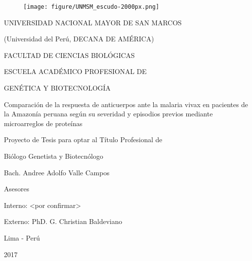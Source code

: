 \documentclass[]{article}
\title{}
\author{}
\date{}
\begin{document}
\renewcommand{\contentsname}{Índice General} 
\renewcommand{\tablename}{Tabla}
\renewcommand{\tableautorefname}{Tabla}


\clearpage
{} \vspace*{\fill}

\begin{centering}

\begin{figure}[!ht]
  \begin{center}
    \texttt{[image: figure/UNMSM\_escudo-2000px.png]}
  \end{center}
\end{figure}

\Large
UNIVERSIDAD NACIONAL MAYOR DE SAN MARCOS

\large
(Universidad del Perú, DECANA DE AMÉRICA)

\vspace{.5 cm}

\Large
FACULTAD DE CIENCIAS BIOLÓGICAS

\vspace{.5 cm}

\normalsize
ESCUELA ACADÉMICO PROFESIONAL DE

GENÉTICA Y BIOTECNOLOGÍA

\vspace{1.5 cm}

\Large
Comparación de la respuesta de anticuerpos ante la %
malaria vivax 
en pacientes de la Amazonía peruana %
según su severidad y episodios previos %
mediante microarreglos de proteínas

\vspace{1.5 cm}

\Large
Proyecto de Tesis para optar al Título Profesional de 

Biólogo Genetista y Biotecnólogo

\vspace{1 cm}

\Large
Bach. Andree Adolfo Valle Campos

\vspace{1.2 cm}

\Large
Asesores 

Interno: <por confirmar>%

Externo: PhD. G. Christian Baldeviano


\vspace{1.2 cm}

Lima - Perú

\vspace{.5 cm}

2017

\end{centering}
\end{document}
